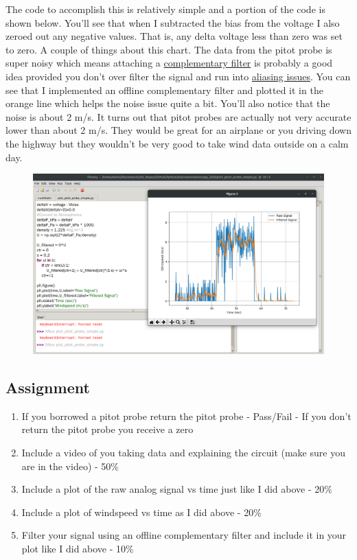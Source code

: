 The code to accomplish this is relatively simple and a portion of the code is shown below. You’ll see that when I subtracted the bias from the voltage I also zeroed out any negative values. That is, any delta voltage less than zero was set to zero. A couple of things about this chart. The data from the pitot probe is super noisy which means attaching a \href{https://youtu.be/zTGa4sk6UZE}{complementary filter} is probably a good idea provided you don’t over filter the signal and run into \href{https://youtu.be/8F_8st_8MmA}{aliasing issues}. You can see that I implemented an offline complementary filter and plotted it in the orange line which helps the noise issue quite a bit. You’ll also notice that the noise is about 2 m/s. It turns out that pitot probes are actually not very accurate lower than about 2 m/s. They would be great for an airplane or you driving down the highway but they wouldn’t be very good to take wind data outside on a calm day.
\begin{figure}[H]
  \begin{center}
    \includegraphics[width=\textwidth]{Figures/pitot_probe_final.png}
  \end{center}
\end{figure}

\subsection{Assignment}



\begin{enumerate}[itemsep=-5pt]
\item If you borrowed a pitot probe return the pitot probe - Pass/Fail - If you don’t return the pitot probe you receive a zero
\item Include a video of you taking data and explaining the circuit (make sure you are in the video) - 50\%
\item Include a plot of the raw analog signal vs time just like I did above - 20\%
\item Include a plot of windspeed vs time as I did above - 20\%
\item Filter your signal using an offline complementary filter and include it in your plot like I did above - 10\%
\end{enumerate}
